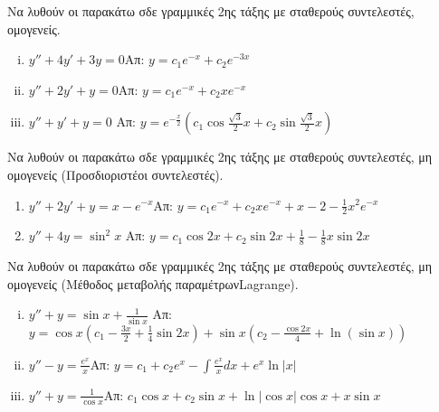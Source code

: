   \item Να λυθούν οι παρακάτω σδε γραμμικές 2ης τάξης με σταθερούς συντελεστές, 
    ομογενείς.

    \begin{enumerate}[i)]
      \item $y''+4y'+3y=0$\hfill Απ: $y=c_1e^{-x}+c_2e^{-3x}$
      \item $y''+2y'+y=0$\hfill Απ: $y=c_1e^{-x}+c_2xe^{-x}$
      \item $y''+y'+y=0$
        \hfill Απ: $y=e^{-\frac{x}{2}}(c_1\cos\frac{\sqrt3}{2}x+c_2\sin\frac{\sqrt{3}}{2}x)$
    \end{enumerate}

  \item Να λυθούν οι παρακάτω σδε γραμμικές 2ης τάξης με σταθερούς συντελεστές, μη 
    ομογενείς (Προσδιοριστέοι συντελεστές).

    \begin{enumerate}
      \item $y''+2y'+y=x-e^{-x}$\hfill Απ: $y=c_1e^{-x}+c_2xe^{-x}+x-2-\frac{1}{2}x^2e^{-x}$
      \item $y''+4y=\sin^2x$
        \hfill Απ: $y=c_1\cos 2x+c_2\sin 2x+\frac{1}{8}-\frac{1}{8}x\sin 2x$
    \end{enumerate}

  \item Να λυθούν οι παρακάτω σδε γραμμικές 2ης τάξης με σταθερούς συντελεστές, 
    μη ομογενείς (Μέθοδος μεταβολής παραμέτρωνLagrange).

    \begin{enumerate}[i)]
      \item $y''+y=\sin x +\frac{1}{\sin x}$
        \hfill Απ: $y=\cos x(c_1-\frac{3x}{2}+\frac{1}{4}\sin 2x)+
        \sin x (c_2-\frac{\cos 2x}{4}+\ln(\sin x))$
      \item $y''-y=\frac{e^x}{x}$\hfill Απ: $y=c_1+c_2e^x-\int \frac{e^x}{x}dx+e^x\ln|x|$
      \item $y''+y=\frac{1}{\cos x}$\hfill Απ: $c_1\cos x+c_2\sin x+\ln|\cos x|\cos x+x\sin x$
    \end{enumerate}

